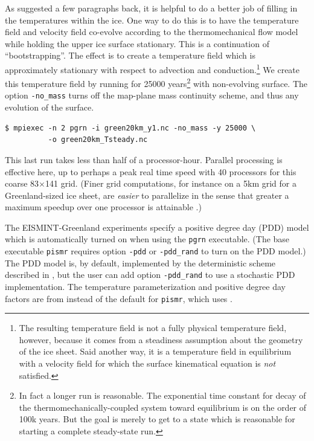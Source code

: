 \documentclass[11pt,final]{amsart}
\begin{document}
As suggested a few paragraphs back, it is helpful to do a better job of filling in the temperatures within the ice.  One way to do this is to have the temperature field and velocity field co-evolve according to the thermomechanical flow model while holding the upper ice surface stationary.  This is a continuation of ``bootstrapping''.  The effect is to create a temperature field which is approximately stationary with respect to advection and conduction.\footnote{The resulting temperature field is not a fully physical temperature field, however, because it comes from a steadiness assumption about the geometry of the ice sheet.  Said another way, it is a temperature field in equilibrium with a velocity field for which the surface kinematical equation \cite{Fowler} is \emph{not} satisfied.}  We create this temperature field by running for 25000 years\footnote{In fact a longer run is reasonable.  The exponential time constant for decay of the thermomechanically-coupled system toward equilibrium is on the order of 100k years.  But the goal is merely to get to a state which is reasonable for starting a complete steady-state run.} with non-evolving surface.  The option \verb|-no_mass| turns off the map-plane mass continuity scheme, and thus any evolution of the surface.

\begin{verbatim}
$ mpiexec -n 2 pgrn -i green20km_y1.nc -no_mass -y 25000 \
          -o green20km_Tsteady.nc
\end{verbatim}
\noindent This last run takes less than half of a processor-hour.  Parallel processing is effective here, up to perhaps a peak real time speed with 40 processors for this coarse 83$\times$141 grid.  (Finer grid computations, for instance on a 5km grid for a Greenland-sized ice sheet, are \emph{easier} to parallelize in the sense that greater a maximum speedup over one processor is attainable \cite{BBssasliding}.)

The EISMINT-Greenland experiments \cite{RitzEISMINT} specify a positive degree day (PDD) model which is automatically turned on when using the \verb|pgrn| executable.  (The base executable \verb|pismr| requires option \verb|-pdd| or \verb|-pdd_rand| to turn on the PDD model.)  The PDD model is, by default, implemented by the deterministic scheme described in \cite{CalovGreve05}, but the user can add option \verb|-pdd_rand| to use a stochastic PDD implementation.  The temperature parameterization and positive degree day factors are from \cite{RitzEISMINT} instead of the default for \verb|pismr|, which uses \cite{Faustoetal2009}.
\end{document}
